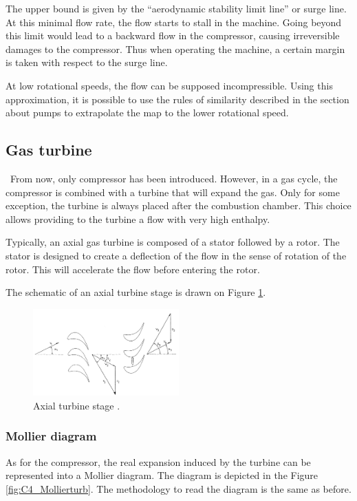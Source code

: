 The upper bound is given by the “aerodynamic stability limit line'' or surge line. At this minimal flow rate, the flow starts to stall in the machine. Going beyond this limit would lead to a backward flow in the compressor, causing irreversible damages to the compressor. Thus when operating the machine, a certain margin is taken with respect to the surge line.

At low rotational speeds, the flow can be supposed incompressible. Using this approximation, it is possible to use the rules of similarity described in the section about pumps to extrapolate the map to the lower rotational speed.

\subsection{Gas turbine}
\quad\ From now, only compressor has been introduced. However, in a gas cycle, the compressor is combined with a turbine that will expand the gas. Only for some exception, the turbine is always placed after the combustion chamber. This choice allows providing to the turbine a flow with very high enthalpy.

Typically, an axial gas turbine is composed of a stator followed by a rotor. The stator is designed to create a deflection of the flow in the sense of rotation of the rotor. This will accelerate the flow before entering the rotor.

The schematic of an axial turbine stage is drawn on Figure \ref{fig:C4_turbstage}.
\begin{figure}[h]
    \centering
    \includegraphics[width=0.5\textwidth]{Turb_stage.png}
    \caption{Axial turbine stage \cite{Hillewaert2019}.}
    \label{fig:C4_turbstage}
\end{figure}
\subsubsection{Mollier diagram}
As for the compressor, the real expansion induced by the turbine can be represented into a Mollier diagram. The diagram is depicted in the Figure \ref{fig:C4_Mollierturb}. The methodology to read the diagram is the same as before.


